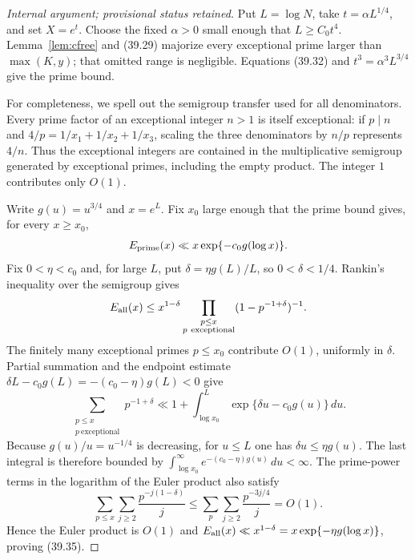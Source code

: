\documentclass[10pt,reqno]{amsart}
\theoremstyle{definition}
\newcommand{\1}{\mathbf 1}
\begin{document}
\begin{proof}[Internal argument; provisional status retained]
Put $L=\log N$, take $t=\alpha L^{1/4}$, and set $X=e^t$.  Choose the fixed
$\alpha>0$ small enough that $L\geq C_0t^4$.
Lemma~\ref{lem:cfree} and (39.29) majorize every exceptional prime larger
than $\max(K,y)$; that omitted range is negligible.  Equations (39.32) and
$t^3=\alpha^3L^{3/4}$ give the prime bound.

For completeness, we spell out the semigroup transfer used for all
denominators.  Every prime factor of an exceptional integer $n>1$ is itself
exceptional: if $p\mid n$ and
$4/p=1/x_1+1/x_2+1/x_3$, scaling the three denominators by $n/p$ represents
$4/n$.  Thus the exceptional integers are contained in the multiplicative
semigroup generated by exceptional primes, including the empty product.
The integer $1$ contributes only $O(1)$.

Write $g(u)=u^{3/4}$ and $x=e^L$.  Fix $x_0$ large enough that the prime
bound gives, for every $x\geq x_0$,
\[
 E_{\rm prime}(x)\ll x\exp\{-c_0g(\log x)\}.
\]
Fix $0<\eta<c_0$ and, for large $L$, put
$\delta=\eta g(L)/L$, so $0<\delta<1/4$.  Rankin's inequality over the
semigroup gives
\[
 E_{\rm all}(x)\leq x^{1-\delta}
 \prod_{\substack{p\leq x\\p\ \text{exceptional}}}
       (1-p^{-1+\delta})^{-1}.
\]
The finitely many exceptional primes $p\leq x_0$ contribute $O(1)$,
uniformly in $\delta$.  Partial summation and the endpoint estimate
$\delta L-c_0g(L)=-(c_0-\eta)g(L)<0$ give
\[
 \sum_{\substack{p\leq x\\p\ \text{exceptional}}}p^{-1+\delta}
 \ll1+\int_{\log x_0}^L\exp\{\delta u-c_0g(u)\}\,du.
\]
Because $g(u)/u=u^{-1/4}$ is decreasing, for $u\leq L$ one has
$\delta u\leq\eta g(u)$.  The last integral is therefore bounded by
$\int_{\log x_0}^\infty e^{-(c_0-\eta)g(u)}\,du<\infty$.  The prime-power
terms in the logarithm of the Euler product also satisfy
\[
 \sum_{p\leq x}\sum_{j\geq2}\frac{p^{-j(1-\delta)}}j
 \leq\sum_p\sum_{j\geq2}\frac{p^{-3j/4}}j=O(1).
\]
Hence the Euler product is $O(1)$ and
$E_{\rm all}(x)\ll x^{1-\delta}=x\exp\{-\eta g(\log x)\}$, proving
(39.35).
\end{proof}

\begin{center}
\end{center}
\end{document}
